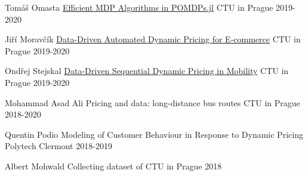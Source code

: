 


\begin{cvhonors}
  \cvhonor
    {Tomáš Omasta} %
    {\href{https://dspace.cvut.cz/handle/10467/94418?locale-attribute=en}{Efficient MDP Algorithms in POMDPs.jl}} %
    {CTU in Prague} %
    {2019-2020} %

  \cvhonor
    {Jiří Moravčík} %
    {\href{https://dspace.cvut.cz/handle/10467/94420?locale-attribute=en}{Data-Driven Automated Dynamic Pricing for E-commerce}} %
    {CTU in Prague} %
    {2019-2020} %

  \cvhonor
    {Ondřej Stejskal} %
    {\href{https://dspace.cvut.cz/handle/10467/94413?locale-attribute=en}{Data-Driven Sequential Dynamic Pricing in Mobility}} %
    {CTU in Prague} %
    {2019-2020} %

  \cvhonor
    {Mohammad Asad Ali} %
    {Pricing and data: long-distance bus routes} %
    {CTU in Prague} %
    {2018-2020} %

  \cvhonor
    {Quentin Podio} %
    {Modeling of Customer Behaviour in Response to Dynamic Pricing} %
    {\hspace{-3em}Polytech Clermont} %
    {2018-2019} %

  \cvhonor
    {Albert Mohwald} %
    {Collecting dataset of } %
    {CTU in Prague} %
    {2018} %

\end{cvhonors}

